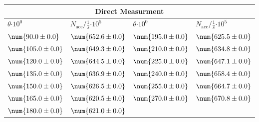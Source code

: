 \begin{tabular}{|p{}|p{}||p{}|p{}|}
\hline
\multicolumn{4}{|c|}{Direct Measurment}\\
\hline
$\theta$$\cdot 10^{0}$&$N_\text{acc}/\frac{1}{s}$$\cdot 10^{5}$&$\theta$$\cdot 10^{0}$&$N_\text{acc}/\frac{1}{s}$$\cdot 10^{5}$\\
\hline
$\num{90.0\pm 0.0}$&$\num{652.6\pm 0.0}$&$\num{195.0\pm 0.0}$&$\num{625.5\pm 0.0}$\\
$\num{105.0\pm 0.0}$&$\num{649.3\pm 0.0}$&$\num{210.0\pm 0.0}$&$\num{634.8\pm 0.0}$\\
$\num{120.0\pm 0.0}$&$\num{644.5\pm 0.0}$&$\num{225.0\pm 0.0}$&$\num{647.1\pm 0.0}$\\
$\num{135.0\pm 0.0}$&$\num{636.9\pm 0.0}$&$\num{240.0\pm 0.0}$&$\num{658.4\pm 0.0}$\\
$\num{150.0\pm 0.0}$&$\num{626.5\pm 0.0}$&$\num{255.0\pm 0.0}$&$\num{664.7\pm 0.0}$\\
$\num{165.0\pm 0.0}$&$\num{620.5\pm 0.0}$&$\num{270.0\pm 0.0}$&$\num{670.8\pm 0.0}$\\
$\num{180.0\pm 0.0}$&$\num{621.0\pm 0.0}$&&\\
\hline
\end{tabular}
